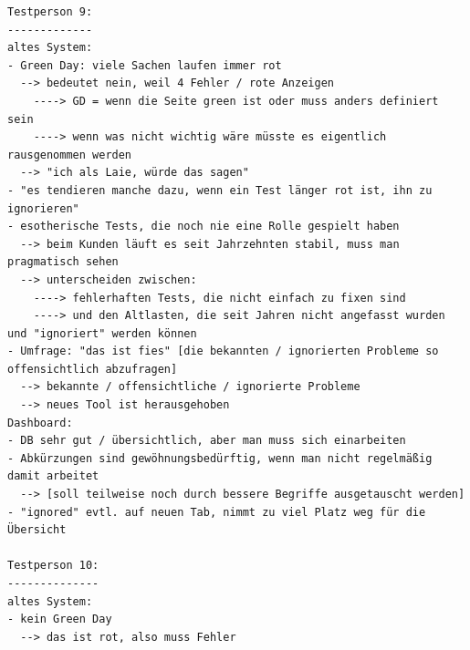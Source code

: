 \begin{lstlisting}[language={[LaTeX]TeX},inputencoding={utf8}]
Testperson 9:
-------------
altes System:
- Green Day: viele Sachen laufen immer rot
  --> bedeutet nein, weil 4 Fehler / rote Anzeigen
    ----> GD = wenn die Seite green ist oder muss anders definiert sein
    ----> wenn was nicht wichtig wäre müsste es eigentlich rausgenommen werden
  --> "ich als Laie, würde das sagen"
- "es tendieren manche dazu, wenn ein Test länger rot ist, ihn zu ignorieren"
- esotherische Tests, die noch nie eine Rolle gespielt haben
  --> beim Kunden läuft es seit Jahrzehnten stabil, muss man pragmatisch sehen
  --> unterscheiden zwischen:
    ----> fehlerhaften Tests, die nicht einfach zu fixen sind
    ----> und den Altlasten, die seit Jahren nicht angefasst wurden und "ignoriert" werden können
- Umfrage: "das ist fies" [die bekannten / ignorierten Probleme so offensichtlich abzufragen]
  --> bekannte / offensichtliche / ignorierte Probleme
  --> neues Tool ist herausgehoben
Dashboard:
- DB sehr gut / übersichtlich, aber man muss sich einarbeiten
- Abkürzungen sind gewöhnungsbedürftig, wenn man nicht regelmäßig damit arbeitet
  --> [soll teilweise noch durch bessere Begriffe ausgetauscht werden]
- "ignored" evtl. auf neuen Tab, nimmt zu viel Platz weg für die Übersicht

Testperson 10:
--------------
altes System:
- kein Green Day 
  --> das ist rot, also muss Fehler


\end{lstlisting}
